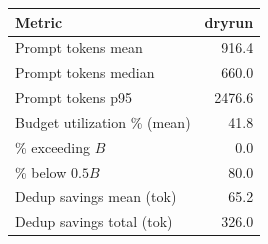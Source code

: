 \begin{tabular}{lr}
\toprule
Metric & dryrun \\
\midrule
Prompt tokens mean & 916.4 \\
Prompt tokens median & 660.0 \\
Prompt tokens p95 & 2476.6 \\
Budget utilization \% (mean) & 41.8 \\
\% exceeding $B$ & 0.0 \\
\% below $0.5B$ & 80.0 \\
Dedup savings mean (tok) & 65.2 \\
Dedup savings total (tok) & 326.0 \\
\bottomrule
\end{tabular}
